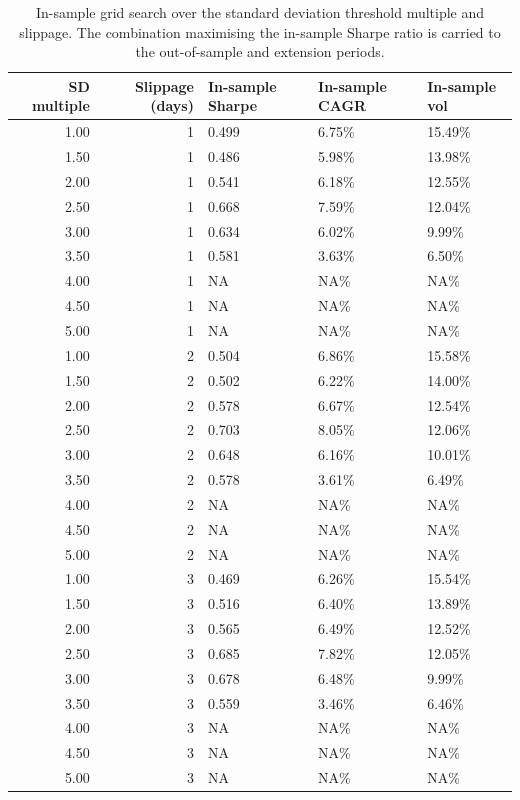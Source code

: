\begin{table}[H]
\centering
\caption{In-sample grid search over the standard deviation threshold multiple and slippage. The combination maximising the in-sample Sharpe ratio is carried to the out-of-sample and extension periods.} 
\label{tab:backtest_opt}
\begin{tabular}{rrlll}
  \toprule
SD multiple & Slippage (days) & In-sample Sharpe & In-sample CAGR & In-sample vol \\ 
  \midrule
1.00 &   1 & 0.499 & 6.75\% & 15.49\% \\ 
  1.50 &   1 & 0.486 & 5.98\% & 13.98\% \\ 
  2.00 &   1 & 0.541 & 6.18\% & 12.55\% \\ 
  2.50 &   1 & 0.668 & 7.59\% & 12.04\% \\ 
  3.00 &   1 & 0.634 & 6.02\% & 9.99\% \\ 
  3.50 &   1 & 0.581 & 3.63\% & 6.50\% \\ 
  4.00 &   1 & NA & NA\% & NA\% \\ 
  4.50 &   1 & NA & NA\% & NA\% \\ 
  5.00 &   1 & NA & NA\% & NA\% \\ 
  1.00 &   2 & 0.504 & 6.86\% & 15.58\% \\ 
  1.50 &   2 & 0.502 & 6.22\% & 14.00\% \\ 
  2.00 &   2 & 0.578 & 6.67\% & 12.54\% \\ 
  2.50 &   2 & 0.703 & 8.05\% & 12.06\% \\ 
  3.00 &   2 & 0.648 & 6.16\% & 10.01\% \\ 
  3.50 &   2 & 0.578 & 3.61\% & 6.49\% \\ 
  4.00 &   2 & NA & NA\% & NA\% \\ 
  4.50 &   2 & NA & NA\% & NA\% \\ 
  5.00 &   2 & NA & NA\% & NA\% \\ 
  1.00 &   3 & 0.469 & 6.26\% & 15.54\% \\ 
  1.50 &   3 & 0.516 & 6.40\% & 13.89\% \\ 
  2.00 &   3 & 0.565 & 6.49\% & 12.52\% \\ 
  2.50 &   3 & 0.685 & 7.82\% & 12.05\% \\ 
  3.00 &   3 & 0.678 & 6.48\% & 9.99\% \\ 
  3.50 &   3 & 0.559 & 3.46\% & 6.46\% \\ 
  4.00 &   3 & NA & NA\% & NA\% \\ 
  4.50 &   3 & NA & NA\% & NA\% \\ 
  5.00 &   3 & NA & NA\% & NA\% \\ 
   \bottomrule
\end{tabular}
\end{table}
